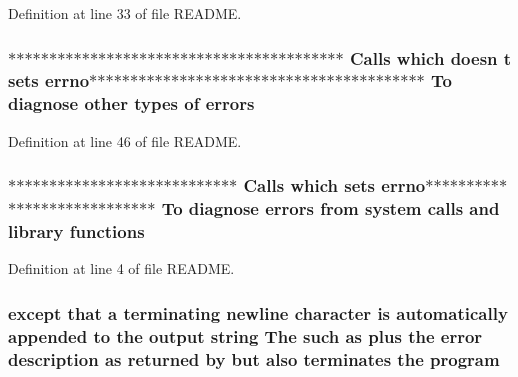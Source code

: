 Definition at line 33 of file R\-E\-A\-D\-M\-E.

\hypertarget{common_2README_a9912daeb8cc621a6ee8e1d24ebdbe601}{
\subsubsection[{errors}]{\setlength{\rightskip}{0pt plus 5cm}$\ast$$\ast$$\ast$$\ast$$\ast$$\ast$$\ast$$\ast$$\ast$$\ast$$\ast$$\ast$$\ast$$\ast$$\ast$$\ast$$\ast$$\ast$$\ast$$\ast$$\ast$$\ast$$\ast$$\ast$$\ast$$\ast$$\ast$$\ast$$\ast$$\ast$$\ast$$\ast$$\ast$$\ast$$\ast$$\ast$$\ast$$\ast$$\ast$$\ast$$\ast$ Calls which doesn t sets {\bf errno}$\ast$$\ast$$\ast$$\ast$$\ast$$\ast$$\ast$$\ast$$\ast$$\ast$$\ast$$\ast$$\ast$$\ast$$\ast$$\ast$$\ast$$\ast$$\ast$$\ast$$\ast$$\ast$$\ast$$\ast$$\ast$$\ast$$\ast$$\ast$$\ast$$\ast$$\ast$$\ast$$\ast$$\ast$$\ast$$\ast$$\ast$$\ast$$\ast$$\ast$$\ast$ To diagnose other types of errors}}\label{common_2README_a9912daeb8cc621a6ee8e1d24ebdbe601}


Definition at line 46 of file R\-E\-A\-D\-M\-E.

\hypertarget{common_2README_a853571ba73c010b99ff2788a0cfe4395}{
\subsubsection[{functions}]{\setlength{\rightskip}{0pt plus 5cm}$\ast$$\ast$$\ast$$\ast$$\ast$$\ast$$\ast$$\ast$$\ast$$\ast$$\ast$$\ast$$\ast$$\ast$$\ast$$\ast$$\ast$$\ast$$\ast$$\ast$$\ast$$\ast$$\ast$$\ast$$\ast$$\ast$$\ast$$\ast$ Calls which sets {\bf errno}$\ast$$\ast$$\ast$$\ast$$\ast$$\ast$$\ast$$\ast$$\ast$$\ast$$\ast$$\ast$$\ast$$\ast$$\ast$$\ast$$\ast$$\ast$$\ast$$\ast$$\ast$$\ast$$\ast$$\ast$$\ast$$\ast$$\ast$$\ast$ To diagnose {\bf errors} from system calls and {\bf library} functions}}\label{common_2README_a853571ba73c010b99ff2788a0cfe4395}


Definition at line 4 of file R\-E\-A\-D\-M\-E.

\hypertarget{common_2README_a2648c031e7768d2922f9bceca11215d9}{
\subsubsection[{program}]{\setlength{\rightskip}{0pt plus 5cm}except that a terminating newline character is automatically appended to {\bf the} output string The such as plus {\bf the} {\bf error} description as returned by but also terminates {\bf the} program}}\label{common_2README_a2648c031e7768d2922f9bceca11215d9}


